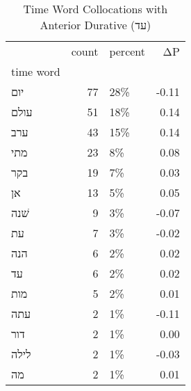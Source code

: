 \begin{table}[htbp!]
\centering
\caption{Time Word Collocations with Anterior Durative (עד)}
\label{table:antdurעד_head_cpd}
\begin{tabular}{lrlr}
\toprule
{} &  count & percent &    ΔP \\
time word &        &         &       \\
\midrule
יום       &     77 &     28\% & -0.11 \\
עולם      &     51 &     18\% &  0.14 \\
ערב       &     43 &     15\% &  0.14 \\
מתי       &     23 &      8\% &  0.08 \\
בקר       &     19 &      7\% &  0.03 \\
אן        &     13 &      5\% &  0.05 \\
שׁנה      &      9 &      3\% & -0.07 \\
עת        &      7 &      3\% & -0.02 \\
הנה       &      6 &      2\% &  0.02 \\
עד        &      6 &      2\% &  0.02 \\
מות       &      5 &      2\% &  0.01 \\
עתה       &      2 &      1\% & -0.11 \\
דור       &      2 &      1\% &  0.00 \\
לילה      &      2 &      1\% & -0.03 \\
מה        &      2 &      1\% &  0.01 \\
\bottomrule
\end{tabular}
\end{table}
